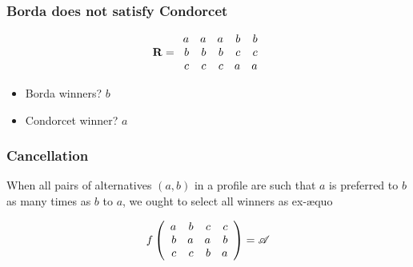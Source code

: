 \documentclass[french,english]{beamer}
\begin{document}
\begin{frame}
	\frametitle{Borda does not satisfy Condorcet}
	\begin{equation}
		\mathbf{R} =
		\begin{array}{rrrrr}
			a	&	a	&	a	&	b	&	b\\
			b	&	b	&	b	&	c	&	c\\
			c	&	c	&	c	&	a	&	a
		\end{array}
	\end{equation}
	\begin{itemize}
		\item Borda winners? \pause $b$
		\item Condorcet winner? \pause $a$
	\end{itemize}
\end{frame}

\begin{frame}
	\frametitle{Cancellation}
	\begin{definition}[Cancellation]
		When all pairs of alternatives $(a, b)$ in a profile are such that $a$ is preferred to $b$ as many times as $b$ to $a$, we ought to select all winners as ex-æquo
	\end{definition}
	\begin{example}
		\begin{equation}
			f\left(%
			\begin{array}{rrrr}
				a&b&c&c\\
				b&a&a&b\\
				c&c&b&a\\
			\end{array}\right) = \allalts
		\end{equation}
	\end{example}
\end{frame}
\end{document}
